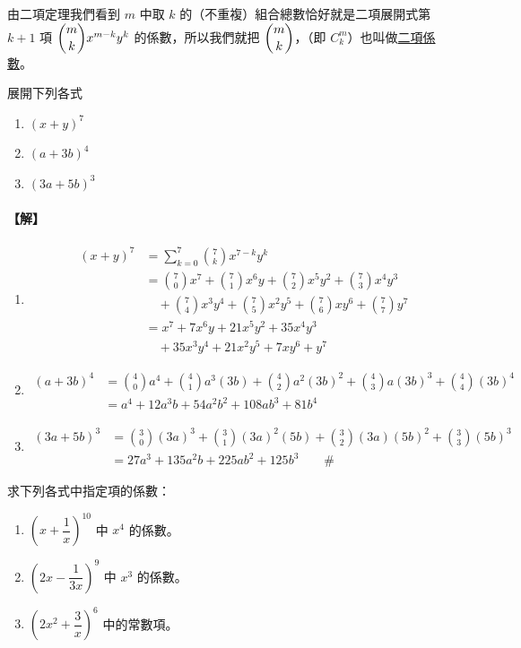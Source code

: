 由二項定理我們看到 $m$ 中取 $k$ 的（不重複）組合總數恰好就是二項展開式第 $k+1$ 項 $\dbinom{m}{k} x^{m-k} y^k$ 的係數，所以我們就把 $\dbinom{m}{k}$，（即 $C^m_k$）也叫做\underline{二項係數}。

\medskip
\begin{example}\label{ex:b5-2-19}
展開下列各式
\begin{enumerate}[label=(\roman*)]
  \item $(x + y)^7$
  \item $(a + 3b)^4$
  \item $(3a + 5b)^3$
\end{enumerate}
\end{example}
\paragraph{【解】}
\begin{enumerate}[label=(\roman*)]
  \item \begin{align*}
  (x + y)^7 &= \sum_{k=0}^7 \binom{7}{k} x^{7-k} y^k \\
  &= \binom{7}{0} x^7 + \binom{7}{1} x^6 y + \binom{7}{2} x^5 y^2 + \binom{7}{3} x^4 y^3 \\
  &\quad + \binom{7}{4} x^3 y^4 + \binom{7}{5} x^2 y^5 + \binom{7}{6} x y^6 + \binom{7}{7} y^7 \\
  &= x^7 + 7x^6 y + 21x^5 y^2 + 35x^4 y^3 \\
  &\quad + 35x^3 y^4 + 21x^2 y^5 + 7xy^6 + y^7
  \end{align*}
  \item \begin{align*}
  (a + 3b)^4 &= \binom{4}{0} a^4 + \binom{4}{1} a^3 (3b) + \binom{4}{2} a^2 (3b)^2 + \binom{4}{3} a (3b)^3 + \binom{4}{4} (3b)^4 \\
  &= a^4 + 12a^3 b + 54a^2 b^2 + 108ab^3 + 81b^4
  \end{align*}
  \item \begin{align*}
  (3a + 5b)^3 &= \binom{3}{0} (3a)^3 + \binom{3}{1} (3a)^2 (5b) + \binom{3}{2} (3a)(5b)^2 + \binom{3}{3} (5b)^3 \\
  &= 27a^3 + 135a^2 b + 225ab^2 + 125b^3 \qquad \#
  \end{align*}
\end{enumerate}

\medskip
\begin{example}\label{ex:b5-2-20}
求下列各式中指定項的係數：
\begin{enumerate}[label=(\roman*)]
  \item $\left(x + \dfrac{1}{x}\right)^{10}$ 中 $x^4$ 的係數。
  \item $\left(2x - \dfrac{1}{3x}\right)^9$ 中 $x^3$ 的係數。
  \item $\left(2x^2 + \dfrac{3}{x}\right)^6$ 中的常數項。
\end{enumerate}
\end{example}
